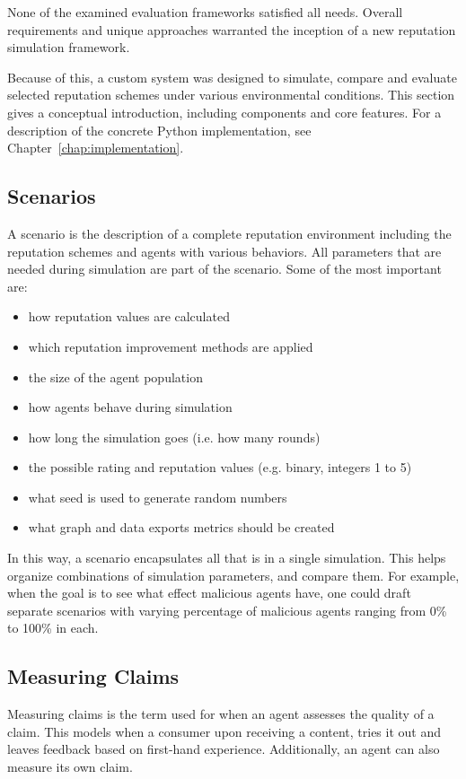 \documentclass[%
    ]{\PathToTumTemplate/thesis/tum_thesis}
\begin{document}
None of the examined evaluation frameworks satisfied all needs.
Overall requirements and unique approaches warranted the inception of a new reputation simulation framework.

Because of this, a custom system was designed to simulate, compare and evaluate selected reputation schemes under various environmental conditions.
This section gives a conceptual introduction, including components and core features.
For a description of the concrete Python implementation, see Chapter~\ref{chap:implementation}.



\subsection{Scenarios}\label{sec:scenario}
A \gls{scenario} is the description of a complete reputation environment including the reputation schemes and agents with various behaviors.
All parameters that are needed during simulation are part of the scenario.
Some of the most important are:
\begin{itemize}
	\item how reputation values are calculated
	\item which reputation improvement methods are applied
	\item the size of the agent population
	\item how agents behave during simulation
	\item how long the simulation goes (i.e. how many rounds)
	\item the possible rating and reputation values (e.g. binary, integers 1 to 5)
	\item what seed is used to generate random numbers
	\item what graph and data exports metrics should be created
\end{itemize}

In this way, a scenario encapsulates all that is in a single simulation.
This helps organize combinations of simulation parameters, and compare them.
For example, when the goal is to see what effect malicious agents have, one could draft separate scenarios with varying percentage of malicious agents ranging from 0\% to 100\% in each.


\subsection{Measuring Claims}\label{sec:approach_measure_claim}
Measuring claims is the term used for when an agent assesses the quality of a claim.
This models when a consumer upon receiving a content, tries it out and leaves feedback based on first-hand experience.
Additionally, an agent can also measure its own claim.
\end{document}

